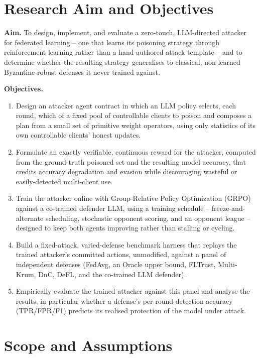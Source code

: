 \section{Research Aim and Objectives}
\label{sec:intro-objectives}

\textbf{Aim.} To design, implement, and evaluate a zero-touch, LLM-directed attacker for federated learning -- one that learns its poisoning strategy through reinforcement learning rather than a hand-authored attack template -- and to determine whether the resulting strategy generalises to classical, non-learned Byzantine-robust defenses it never trained against.

\textbf{Objectives.}
\begin{enumerate}
    \item Design an attacker agent contract in which an LLM policy selects, each round, which of a fixed pool of controllable clients to poison and composes a plan from a small set of primitive weight operators, using only statistics of its own controllable clients' honest updates.
    \item Formulate an exactly verifiable, continuous reward for the attacker, computed from the ground-truth poisoned set and the resulting model accuracy, that credits accuracy degradation and evasion while discouraging wasteful or easily-detected multi-client use.
    \item Train the attacker online with Group-Relative Policy Optimization (GRPO) against a co-trained defender LLM, using a training schedule -- freeze-and-alternate scheduling, stochastic opponent scoring, and an opponent league -- designed to keep both agents improving rather than stalling or cycling.
    \item Build a fixed-attack, varied-defense benchmark harness that replays the trained attacker's committed actions, unmodified, against a panel of independent defenses (FedAvg, an Oracle upper bound, FLTrust, Multi-Krum, DnC, DeFL, and the co-trained LLM defender).
    \item Empirically evaluate the trained attacker against this panel and analyse the results, in particular whether a defense's per-round detection accuracy (TPR/FPR/F1) predicts its realised protection of the model under attack.
\end{enumerate}

\section{Scope and Assumptions}
\label{sec:intro-scope}

